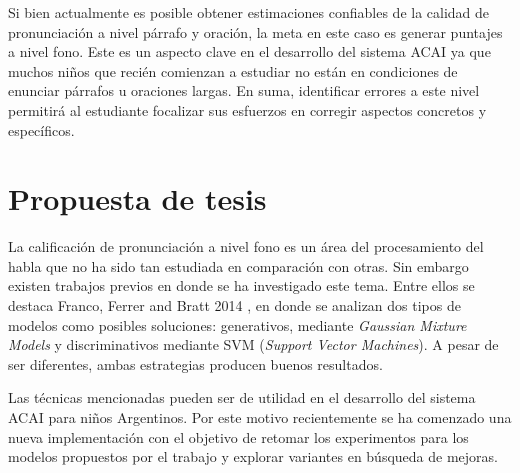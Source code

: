 \documentclass[a4paper,12pt]{article} %
\begin{document}
Si bien actualmente es posible obtener estimaciones confiables de la calidad de 
pronunciación a nivel párrafo y oración, la meta en este caso es generar puntajes 
a nivel fono. Este es un aspecto clave en el 
desarrollo del sistema ACAI ya que muchos niños que recién comienzan a estudiar 
no están en condiciones de enunciar párrafos u oraciones largas. En suma, identificar 
errores a este nivel permitirá al estudiante focalizar sus esfuerzos en corregir 
aspectos concretos y específicos.




\section{Propuesta de tesis}

La calificación de pronunciación a nivel fono es un área del procesamiento del habla
que no ha sido tan estudiada en comparación con otras. Sin embargo existen
trabajos previos en donde se ha investigado este tema. 
Entre ellos se destaca Franco, Ferrer and Bratt 2014 \cite{franco_ferrer_main_paper}, 
en donde se analizan 
dos tipos de modelos como posibles soluciones: generativos, mediante \textit{Gaussian 
Mixture Models} y discriminativos mediante SVM (\textit{Support Vector Machines}). 
A pesar de ser diferentes, ambas estrategias producen buenos resultados.

Las técnicas mencionadas pueden ser de utilidad en el desarrollo
del sistema ACAI para niños Argentinos.
Por este motivo recientemente se ha comenzado una nueva implementación 
con el objetivo de retomar los experimentos para los modelos 
propuestos por el trabajo y explorar variantes en búsqueda de mejoras.
\end{document}
